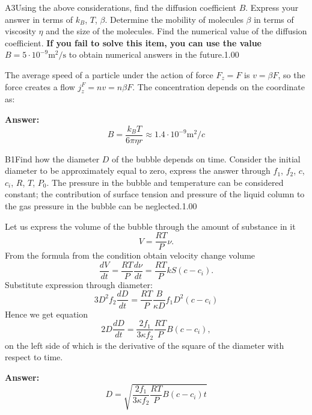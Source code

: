 \documentclass[11pt,a4paper]{article}
\begin{document}
\begin{solcard}{A3}{Using the above considerations, find the diffusion coefficient $B$. Express your answer in terms of $k_B$, $T$, $\beta$. Determine the mobility of molecules $\beta$ in terms of viscosity $\eta$ and the size of the molecules. Find the numerical value of the diffusion coefficient.  \textbf{If you fail to solve this item, you can use the value} $B = 5 \cdot 10^{-9} \text{m}^2/\text{s}$ to obtain numerical answers in the future.}{1.00}

The average speed of a particle under the action of force $F_z=F$ is $v= \beta F$, so the force creates a flow $j_z^F = n v = n \beta F$. The concentration depends on the coordinate as:

\par\smallskip\noindent\textbf{Answer:} $$ B = \frac{k_B T}{6 \pi \eta r} \approx 1.4 \cdot 10^{-9} \mathrm{m}^2/c $$
\end{solcard}

\begin{solcard}{B1}{Find how the diameter $D$ of the bubble depends on time. Consider the initial diameter to be approximately equal to zero, express the answer through $f_1$, $f_2$, $c$, $c_i$, $R$, $T$, $P_0$. The pressure in the bubble and temperature can be considered constant; the contribution of surface tension and pressure of the liquid column to the gas pressure in the bubble can be neglected.}{1.00}

Let us express the volume of the bubble through the amount of substance in it $$ V = \frac{RT}{P} \nu. $$ From the formula from the condition obtain velocity change volume $$ \frac{dV}{dt} = \frac{RT}{P} \frac{d\nu}{dt} = \frac{RT}{P}  k S (c-c_i). $$ Substitute expression through diameter: $$ 3 D^2 f_2\frac{dD}{dt}  = \frac{RT}{P}  \frac{B}{\kappa D} f_1 D^2 (c-c_i) $$ Hence we get equation $$ 2D\frac{dD}{dt} =  \frac{2f_1}{3\kappa f_2} \frac{RT}{P}B(c-c_i), $$ on the left side of which is the derivative of the square of the diameter with respect to time.

\par\smallskip\noindent\textbf{Answer:} $$ D  =  \sqrt{\frac{2f_1}{3\kappa f_2} \frac{RT}{P}B(c-c_i) t} $$
\end{solcard}
\end{document}
